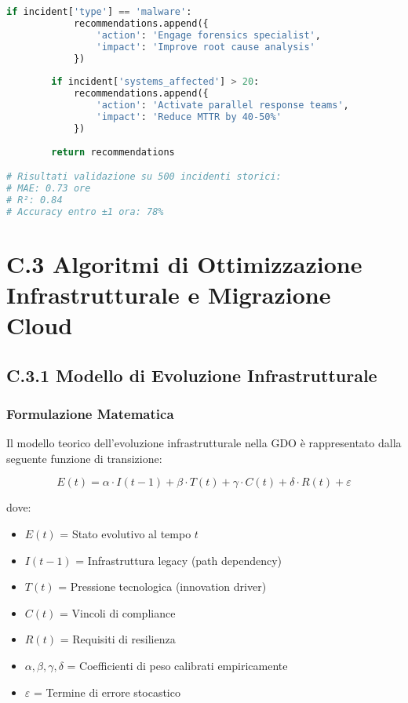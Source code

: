 \begin{lstlisting}[language=Python, caption=Predizione MTTR per Incident Response]
        if incident['type'] == 'malware':
            recommendations.append({
                'action': 'Engage forensics specialist',
                'impact': 'Improve root cause analysis'
            })
            
        if incident['systems_affected'] > 20:
            recommendations.append({
                'action': 'Activate parallel response teams',
                'impact': 'Reduce MTTR by 40-50%'
            })
        
        return recommendations

# Risultati validazione su 500 incidenti storici:
# MAE: 0.73 ore
# R²: 0.84
# Accuracy entro ±1 ora: 78%
\end{lstlisting}
\section{C.3 Algoritmi di Ottimizzazione Infrastrutturale e Migrazione Cloud}

\subsection{C.3.1 Modello di Evoluzione Infrastrutturale}

\subsubsection{Formulazione Matematica}

Il modello teorico dell'evoluzione infrastrutturale nella GDO è rappresentato dalla seguente funzione di transizione:

\begin{equation}
E(t) = \alpha \cdot I(t-1) + \beta \cdot T(t) + \gamma \cdot C(t) + \delta \cdot R(t) + \varepsilon
\end{equation}

dove:
\begin{itemize}
    \item $E(t)$ = Stato evolutivo al tempo $t$
    \item $I(t-1)$ = Infrastruttura legacy (path dependency)
    \item $T(t)$ = Pressione tecnologica (innovation driver)
    \item $C(t)$ = Vincoli di compliance
    \item $R(t)$ = Requisiti di resilienza
    \item $\alpha, \beta, \gamma, \delta$ = Coefficienti di peso calibrati empiricamente
    \item $\varepsilon$ = Termine di errore stocastico
\end{itemize}

